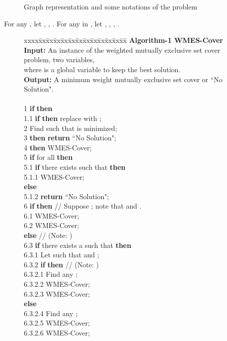 \documentclass[11pt]{article}
\begin{document}
\begin{figure}[ht]
\centering {}
\caption{Graph representation and some notations of the problem}
\label{fig_1}
\end{figure}

For any , let , , . For any  in , let
, , ,
.

\begin{figure}[htb]
\footnotesize
\begin{tabbing}
xxxx\=xx\=xx\=xx\=xx\=xx\=xx\=xx\=xx\=xx\=xx\=xx\=xx\=\kill
{\bf Algorithm-1 WMES-Cover}\\
\textbf{Input:} An instance of the {\sc weighted mutually exclusive set cover} problem, two variables,\\
\>\>\> where  is a global variable to keep the
best solution.\\
\textbf{Output:} A minimum weight mutually exclusive set cover or ``No Solution".\\
\\

1 \> {\bf if}  {\bf then}\\
1.1 \>\> {\bf if}  {\bf then} replace  with ;\\
2 \>Find  such that  is minimized;\\
3   {\bf then} {\bf return} ``No Solution";\\
4   {\bf then} WMES-Cover;\\
5 \> {\bf if}  for all  {\bf
then}\\
5.1 \>\> {\bf if} there exists  such that
 {\bf then}\\
5.1.1 \>\>\> WMES-Cover;\\
 \>\> {\bf else}\\
5.1.2 \>\>\> {\bf return} ``No Solution";\\
6 \> {\bf if}  {\bf then} // Suppose ; note that  and .\\
6.1 \>\> WMES-Cover;\\
6.2 \>\> WMES-Cover;\\
 \> {\bf else} // (Note: )\\
6.3 \>\> {\bf if} there exists a  such that  {\bf then}\\
6.3.1 \>\>\> Let  such that  and ; \\
6.3.2 \>\>\> {\bf if}  {\bf then} //
(Note: ) \\
6.3.2.1 \>\>\>\> Find any ;\\
6.3.2.2 \>\>\>\> WMES-Cover;\\
6.3.2.3 \>\>\>\> WMES-Cover;\\
\>\>\> {\bf else}\\
6.3.2.4 \>\>\>\> Find any ;\\
6.3.2.5 \>\>\>\> WMES-Cover;\\
6.3.2.6 \>\>\>\> WMES-Cover;\\



\end{tabbing}
\end{figure}
\end{document}
